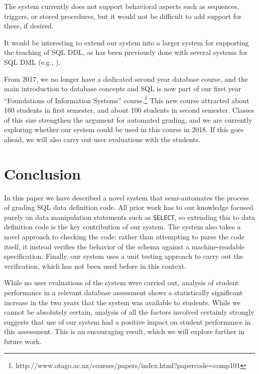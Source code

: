 \documentclass[sigconf, authordraft, capitalise]{acmart}
\begin{document}
The system currently does not support behavioral aspects such as sequences, triggers, or stored procedures, but it would not be difficult to add support for these, if desired.

It would be interesting to extend our system into a larger system for supporting the teaching of SQL DDL, as has been previously done with several systems for SQL DML (e.g., \cite{Kenny.C-2005a-Automated,Kleiner.C-2013a-Automated,Mitrovic.A-1998a-Learning,Russell.G-2004a-Improving,Sadiq.S-2004a-SQLator}).

From 2017, we no longer have a dedicated second year database course, and the main introduction to database concepts and SQL is now part of our first year ``Foundations of Information Systems'' course.\footnote{http://www.otago.ac.nz/courses/papers/index.html?papercode=comp101} This new course attracted about 160 students in first semester, and about 100 students in second semester. Classes of this size strengthen the argument for automated grading, and we are currently exploring whether our system could be used in this course in 2018. If this goes ahead,  we will also carry out user evaluations with the students.


\section{Conclusion}
\label{sec-conclusion}

In this paper we have described a novel system that semi-automates the process of grading SQL data definition code. All prior work has to our knowledge focused purely on data manipulation statements such as \texttt{SELECT}, so extending this to data definition code is the key contribution of our system. The system also takes a novel approach to checking the code: rather than attempting to parse the code itself, it instead verifies the behavior of the schema against a machine-readable specification. Finally, our system uses a unit testing approach to carry out the verification, which has not been used before in this context.

While no user evaluations of the system were carried out, analysis of student performance in a relevant database assessment shows a statistically significant increase in the two years that the system was available to students. While we cannot be absolutely certain, analysis of all the factors involved certainly strongly suggests that use of our system had a positive impact on student performance in this assessment. This is an encouraging result, which we will explore further in future work.




\end{document}
